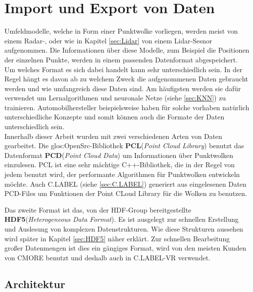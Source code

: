 \section{Import und Export von Daten}
\label{sec:ImportExport}
Umfeldmodelle, welche in Form einer Punktwolke vorliegen, werden meist von einem Radar-, oder wie in Kapitel \ref{sec:Lidar} von einem Lidar-Sesnor aufgenommen. Die Informationen über diese Modelle, zum Beispiel die Positionen der einzelnen Punkte, werden in einem passenden Datenformat abgespeichert. Um welches Format es sich dabei handelt kann sehr unterschiedlich sein. In der Regel hängt es davon ab zu welchem Zweck die aufgenommenen Daten gebraucht werden und wie umfangreich diese Daten sind. Am häufigsten werden sie dafür verwendet um Lernalgorithmen und neuronale Netze (siehe \ref{sec:KNN}) zu trainieren. Automobilhersteller beispielsweise haben für solche vorhaben natürlich unterschiedliche Konzepte und somit können auch die Formate der Daten unterschiedlich sein.\\ 

Innerhalb dieser Arbeit wurden mit zwei verschiedenen Arten von Daten gearbeitet. Die \gls{glos:OpenSrc}-Bibliothek \textbf{PCL}(\textit{Point Cloud Library}) benutzt das Datenformat \textbf{PCD}(\textit{Point Cloud Data}) um Informationen über Punktwolken einzulesen. PCL ist eine sehr mächtige C++-Bibliothek, die in der Regel von jedem benutzt wird, der performante Algorithmen für Punktwolken entwickeln möchte. Auch C.LABEL (siehe \ref{sec:C.LABEL}) generiert aus eingelesenen Daten PCD-Files um Funktionen der Point CLoud Library für die Wolken zu benutzen.

Das zweite Format ist das, von der HDF-Group bereitgestellte \textbf{HDF5}(\textit{Heterogeneous Data Format}). Es ist ausgelegt zur schnellen Erstellung und Auslesung von komplexen Datenstrukturen. Wie diese Strukturen aussehen wird später in Kapitel \ref{sec:HDF5} näher erklärt. Zur schnellen Bearbeitung großer Datenmengen ist dies ein gängiges Format, wird von den meisten Kunden von CMORE benutzt und deshalb auch in C.LABEL-VR verwendet.\\

\subsection{Architektur}

